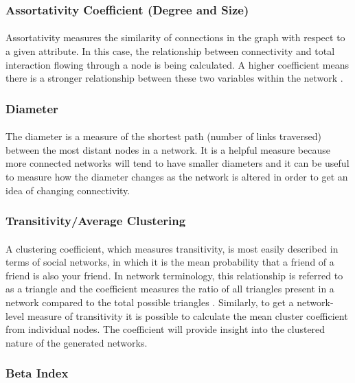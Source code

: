 \documentclass[12pt,a4paper]{thesis}
\begin{document}
\subsubsection{Assortativity Coefficient (Degree and Size)}
\paragraph{}
Assortativity measures the similarity of connections in the graph with respect to a given attribute. In this case, the relationship between connectivity and total interaction flowing through a node is being calculated. A higher coefficient means there is a stronger relationship between these two variables within the network \citep{New03a}. 

\subsubsection{Diameter}
\paragraph{}
The diameter is a measure of the shortest path (number of links traversed) between the most distant nodes in a network. It is a helpful measure because more connected networks will tend to have smaller diameters and it can be useful to measure how the diameter changes as the network is altered in order to get an idea of changing connectivity. 


\subsubsection{Transitivity/Average Clustering}
\paragraph{}
A clustering coefficient, which measures transitivity, is most easily described in terms of social networks, in which it is the mean probability that a friend of a friend is also your friend. In network terminology, this relationship is referred to as a triangle and the coefficient measures the ratio of all triangles present in a network compared to the total possible triangles \citep{New03}. Similarly, to get a network-level measure of transitivity it is possible to calculate the mean cluster coefficient from individual nodes. The coefficient will provide insight into the clustered nature of the generated networks.


\subsubsection{Beta Index}
\end{document}
